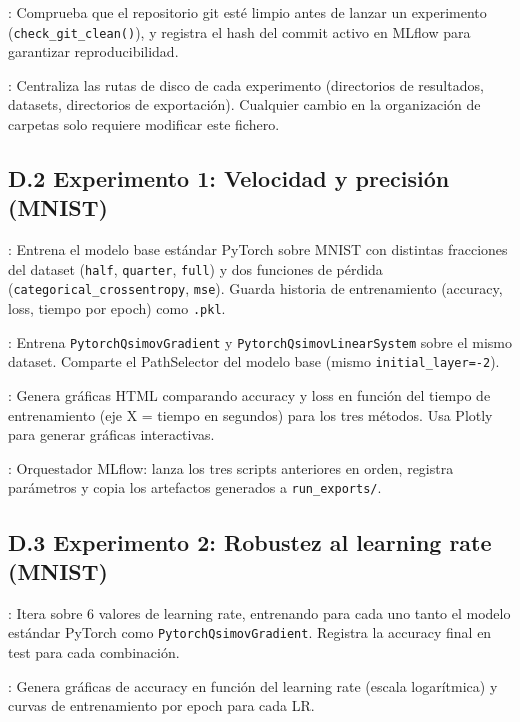 : Comprueba que el repositorio git esté limpio antes de
lanzar un experimento (\texttt{check\_git\_clean()}), y registra el hash del commit activo en
MLflow para garantizar reproducibilidad.

: Centraliza las rutas de disco de cada experimento
(directorios de resultados, datasets, directorios de exportación). Cualquier cambio en la
organización de carpetas solo requiere modificar este fichero.

\subsection{D.2 Experimento 1: Velocidad y precisión (MNIST)}

: Entrena el
modelo base estándar PyTorch sobre MNIST con distintas fracciones del dataset (\texttt{half},
\texttt{quarter}, \texttt{full}) y dos funciones de pérdida (\texttt{categorical\_crossentropy},
\texttt{mse}). Guarda historia de entrenamiento (accuracy, loss, tiempo por epoch) como
\texttt{.pkl}.

: Entrena
\texttt{PytorchQsimovGradient} y \texttt{PytorchQsimovLinearSystem} sobre el mismo dataset.
Comparte el PathSelector del modelo base (mismo \texttt{initial\_layer=-2}).

: Genera gráficas HTML
comparando accuracy y loss en función del tiempo de entrenamiento (eje X = tiempo en segundos) para
los tres métodos. Usa Plotly para generar gráficas interactivas.

: Orquestador MLflow: lanza los tres
scripts anteriores en orden, registra parámetros y copia los artefactos generados a
\texttt{run\_exports/}.

\subsection{D.3 Experimento 2: Robustez al learning rate (MNIST)}

: Itera
sobre 6 valores de learning rate, entrenando para cada uno tanto el modelo estándar PyTorch como
\texttt{PytorchQsimovGradient}. Registra la accuracy final en test para cada combinación.

: Genera gráficas de
accuracy en función del learning rate (escala logarítmica) y curvas de entrenamiento por epoch para
cada LR.

